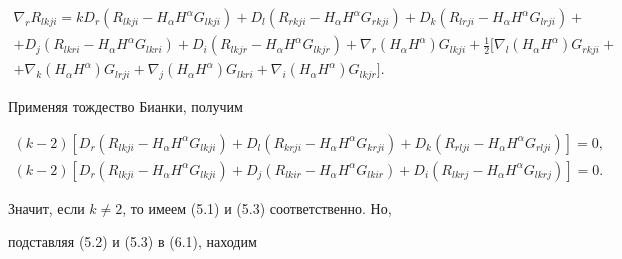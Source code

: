 \begin{multline}


\nabla_r R_{lkji}=k


D_r(R_{lkji}-H_\alpha H^\alpha G_{lkji})+


D_l(R_{rkji}-H_\alpha H^\alpha G_{rkji})+


D_k(R_{lrji}-H_\alpha H^\alpha G_{lrji})+ \\


+D_j(R_{lkri}-H_\alpha H^\alpha G_{lkri})+


D_i(R_{lkjr}-H_\alpha H^\alpha G_{lkjr})+


\nabla_r(H_\alpha H^\alpha)G_{lkji}+\tfrac{1}{2}[


\nabla_l(H_\alpha H^\alpha)G_{rkji}+ \\


+\nabla_k(H_\alpha H^\alpha)G_{lrji}+


\nabla_j(H_\alpha H^\alpha)G_{lkri}+


\nabla_i(H_\alpha H^\alpha)G_{lkjr}].


\tag{6.1}


\end{multline}


Применяя тождество Бианки, получим


\begin{gather*}


(k-2)[


D_r(R_{lkji}-H_\alpha H^\alpha G_{lkji})+


D_l(R_{krji}-H_\alpha H^\alpha G_{krji})+


D_k(R_{rlji}-H_\alpha H^\alpha G_{rlji})]=0, \\


(k-2)[


D_r(R_{lkji}-H_\alpha H^\alpha G_{lkji})+


D_j(R_{lkir}-H_\alpha H^\alpha G_{lkir})+


D_i(R_{lkrj}-H_\alpha H^\alpha G_{lkrj})]=0.


\end{gather*}





Значит, если $k\ne 2$, то имеем (5.1) и (5.3) соответственно. Но,


подставляя (5.2) и (5.3) в (6.1), находим


